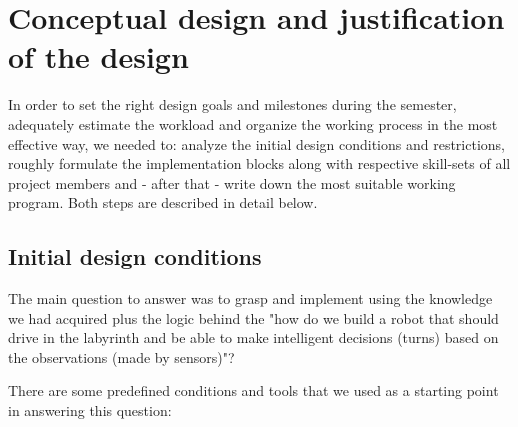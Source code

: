 \section{Conceptual design and justification of the design}

In order to set the right design goals and milestones during the semester, adequately estimate the workload and organize the working process in the most effective way, we needed to: analyze the initial design conditions and restrictions, roughly formulate the implementation blocks along with respective skill-sets of all project members and - after that - write down the most suitable working program. Both steps are described in detail below.

\subsection{Initial design conditions} \label{chap:design_cond}
The main question to answer was to grasp and implement using the knowledge we had acquired plus the logic behind the "how do we build a robot that should drive in the labyrinth and be able to make intelligent decisions (turns) based on the observations (made by sensors)"?

\noindent 
There are some predefined conditions and tools that we used as a starting point in answering this question: 

